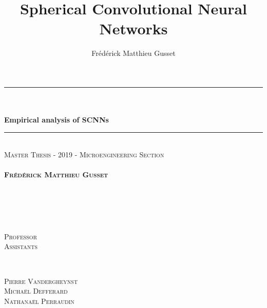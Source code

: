 \documentclass[11pt]{report}
\title{Spherical Convolutional Neural Networks}
\author{Frédérick Matthieu Gusset}
\makeatletter
\let\thetitle\@title
\makeatother
\begin{document}
\nocite{*}
\thispagestyle{empty}
\begin{center}
    \vspace*{0.5 cm}
    
	\rule{\linewidth}{0.2 mm} \\[0.4 cm]
    \vspace{10pt}
	{\huge \bfseries \thetitle}\\
    \vspace{10pt}
    { \large \bfseries Empirical analysis of SCNNs }
    \vspace{10pt}%
    
	\rule{\linewidth}{0.2 mm} \\[1 cm]
	
	{\large %
	\textsc{Master Thesis - 2019 - Microengineering Section\\[1 cm]~}\\[1 cm]				%
    }
    \textsc{\bfseries Fr\'ed\'erick Matthieu Gusset}
	\\[1.7 cm]
	
	\begin{minipage}{0.1\textwidth}
		\begin{flushleft} \large
			\textsc{}\\
            \vspace{10pt}
            \textsc{} \\
			\vspace{10pt}
			\end{flushleft}
			\end{minipage}~
		\begin{minipage}{0.3\textwidth}
		\begin{flushleft} \large
			\textsc{Professor}\\
            \vspace{10pt}
            \textsc{Assistants} \\
			\vspace{10pt}
			\end{flushleft}
			\end{minipage}~
			\begin{minipage}{0.4\textwidth}
			\begin{flushright} 
			\vspace{10pt}\large
			\textsc{Pierre Vandergheynst}\\
            \vspace{10pt}
			\textsc{Michaël Defferard}\\
			\textsc{Nathanaël Perraudin}
		\end{flushright}
	\end{minipage}\\[2 cm]
	

\end{center}
\end{document}
